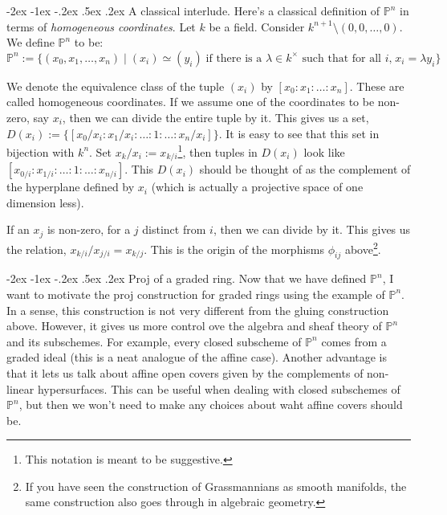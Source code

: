 \documentclass[11pt]{amsart}
\makeatletter
\renewcommand\subsection{\@startsection {subsection}{1}{\z@}%
	{-2ex \@plus -1ex \@minus -.2ex}%
	{.5ex \@plus.2ex}%
	{\normalfont\bfseries}}
\renewcommand{\P}{{\mathbb P}}
\theoremstyle{definition}
\makeatother
\begin{document}
\subsection{A classical interlude.}\label{subsection-homogeneous-coordinates}
Here's a classical definition of $\P^n$ in terms of \textit{homogeneous coordinates}. Let $k$ be a field. Consider $k^{n+1}\setminus{(0,0,\ldots,0)}$. We define $\P^n$ to be:
\[\P^n:=\lbrace (x_0,x_1,\ldots,x_n)\; |\; (x_i)\simeq (y_i)\; \text{if there is a $\lambda\in k^{\times}$ such that for all $i$,}\; x_i=\lambda y_i\rbrace\]

We denote the equivalence class of the tuple $(x_i)$ by $[x_0:x_1:\ldots:x_n]$. These are called homogeneous coordinates. If we assume one of the coordinates to be non-zero, say $x_i$, then we can divide the entire tuple by it. This gives us a set, $D(x_i):=\lbrace [x_0/x_i:x_1/x_i:\ldots:1:\ldots:x_n/x_i]\rbrace$. It is easy to see that this set in bijection with $k^n$. Set $x_k/x_i:=x_{k/i}$\footnote{This notation is meant to be suggestive.}, then tuples in $D(x_i)$ look like $[x_{0/i}:x_{1/i}:\ldots:1:\ldots:x_{n/i}]$. This $D(x_i)$ should be thought of as the complement of the hyperplane defined by $x_i$ (which is actually a projective space of one dimension less). 

If an $x_j$ is non-zero, for a $j$ distinct from $i$, then we can divide by it. This gives us the relation, $x_{k/i}/x_{j/i}=x_{k/j}$. This is the origin of the morphisms $\phi_{ij}$ above\footnote{If you have seen the construction of Grassmannians as smooth manifolds, the same construction also goes through in algebraic geometry.}. %


\subsection{Proj of a graded ring.}\label{subsection-proj-construction}
Now that we have defined $\P^n$, I want to motivate the proj construction for graded rings using the example of $\P^n$. In a sense, this construction is not very different from the gluing construction above. However, it gives us more control ove the algebra and sheaf theory of $\P^n$ and its subschemes. For example, every closed subscheme of $\P^n$ comes from a graded ideal (this is a neat analogue of the affine case). Another advantage is that it lets us talk about affine open covers given by the complements of non-linear hypersurfaces. This can be useful when dealing with closed subschemes of $\P^n$, but then we won't need to make any choices about waht affine covers should be. 
\end{document}
